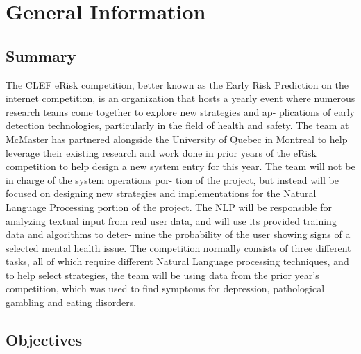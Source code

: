 \documentclass[12pt, titlepage]{article}
\begin{document}
\newpage


\section{General Information}

\subsection{Summary}

The CLEF eRisk competition, better known as the Early Risk Prediction on
the internet competition, is an organization that hosts a yearly event where
numerous research teams come together to explore new strategies and ap-
plications of early detection technologies, particularly in the field of health
and safety. The team at McMaster has partnered alongside the University of
Quebec in Montreal to help leverage their existing research and work done
in prior years of the eRisk competition to help design a new system entry
for this year. The team will not be in charge of the system operations por-
tion of the project, but instead will be focused on designing new strategies
and implementations for the Natural Language Processing portion of the
project. The NLP will be responsible for analyzing textual input from real
user data, and will use its provided training data and algorithms to deter-
mine the probability of the user showing signs of a selected mental health
issue. The competition normally consists of three different tasks, all of which
require different Natural Language processing techniques, and to help select
strategies, the team will be using data from the prior year's competition, which was used
to find symptoms for depression, pathological gambling and eating disorders.

\subsection{Objectives}
\end{document}
